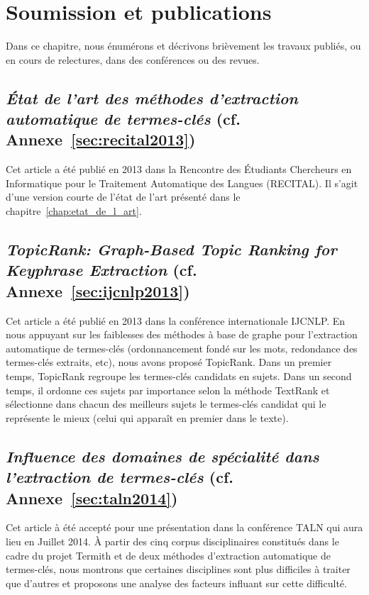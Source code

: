 \chapter{Soumission et publications}
  Dans ce chapitre, nous énumérons et décrivons brièvement les travaux
  publiés, ou en cours de relectures, dans des conférences ou des revues.

  \section{\textit{État de l'art des méthodes d'extraction automatique de
           termes-clés} (cf. Annexe~\ref{sec:recital2013})}
    Cet article a été publié en 2013 dans la Rencontre des Étudiants Chercheurs
    en Informatique pour le Traitement Automatique des Langues (RECITAL). Il
    s'agit d'une version courte de l'état de l'art présenté dans le
    chapitre~\ref{chap:etat_de_l_art}.

  \section{\textit{TopicRank: Graph-Based Topic Ranking for Keyphrase
           Extraction} (cf. Annexe~\ref{sec:ijcnlp2013})}
  \label{sec:resume_ijcnlp2013}
    Cet article a été publié en 2013 dans la conférence internationale IJCNLP.
    En nous appuyant sur les faiblesses des méthodes à base de graphe pour
    l'extraction automatique de termes-clés (ordonnancement fondé sur les mots,
    redondance des termes-clés extraits, etc), nous avons proposé TopicRank.
    Dans un premier temps, TopicRank regroupe les termes-clés candidats en
    sujets. Dans un second temps, il ordonne ces sujets par importance selon la
    méthode TextRank et sélectionne dans chacun des meilleurs sujets le
    termes-clés candidat qui le représente le mieux (celui qui apparaît en
    premier dans le texte).

  \section{\textit{Influence des domaines de spécialité dans l'extraction de
           termes-clés} (cf. Annexe~\ref{sec:taln2014})}
    Cet article à été accepté pour une présentation dans la conférence TALN qui
    aura lieu en Juillet 2014. À partir des cinq corpus disciplinaires
    constitués dans le cadre du projet Termith et de deux méthodes d'extraction
    automatique de termes-clés, nous montrons que certaines disciplines sont
    plus difficiles à traiter que d'autres et proposons une analyse des facteurs
    influant sur cette difficulté.

